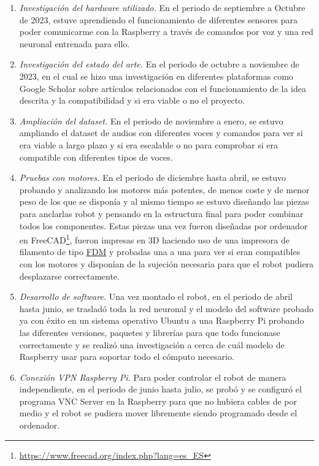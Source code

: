 \begin{enumerate}
 \item \textit{Investigación del hardware utilizado.} En el periodo de septiembre a Octubre de 2023, estuve aprendiendo el funcionamiento de diferentes sensores para poder comunicarme con la Raspberry a través de comandos por voz y una red neuronal entrenada para ello.

 \item \textit{Investigación del estado del arte.} En el periodo de octubre a noviembre de 2023, en el cual se hizo una investigación en diferentes plataformas como Google Scholar sobre artículos relacionados con el funcionamiento de la idea descrita y la compatibilidad y si era viable o no el proyecto.
 
  \item \textit{Ampliación del dataset.} En el periodo de noviembre a enero, se estuvo ampliando el dataset de audios con diferentes voces y comandos para ver si era viable a largo plazo y si era escalable o no para comprobar si era compatible con diferentes tipos de voces.
  
  \item \textit{Pruebas con motores.} En el periodo de diciembre hasta abril, se estuvo probando y analizando los motores más potentes, de menos coste y de menor peso de los que se disponía y al mismo tiempo se estuvo diseñando las piezas para anclarlas robot y pensando en la estructura final para poder combinar todos los componentes. Estas piezas una vez fueron diseñadas por ordenador en FreeCAD\footnote{\url{https://www.freecad.org/index.php?lang=es_ES}}, fueron impresas en 3D haciendo uso de una impresora de filamento de tipo \hyperlink{FDM}{FDM} y probadas una a una para ver si eran compatibles con los motores y disponían de la sujeción necesaria para que el robot pudiera desplazarse correctamente.
  
 \item \textit{Desarrollo de software.} Una vez montado el robot, en el periodo de abril hasta junio, se trasladó toda la red neuronal y el modelo del software probado ya con éxito en un sistema operativo Ubuntu a una Raspberry Pi probando las diferentes versiones, paquetes y librerías para que todo funcionase correctamente y se realizó una investigación a cerca de cuál modelo de Raspberry usar para soportar todo el cómputo necesario.
 
  \item \textit{Conexión VPN Raspberry Pi.} Para poder controlar el robot de manera independiente, en el periodo de junio hasta julio, se probó y se configuró el programa VNC Server en la Raspberry para que no hubiera cables de por medio y el robot se pudiera mover libremente siendo programado desde el ordenador.
  

\end{enumerate}
